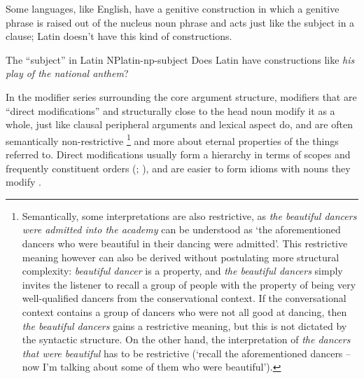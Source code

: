 \documentclass[a4paper, oneside, 12pt]{report}
\newcommand*{\citepage}[1]{p.~{#1}}
\newcommand*{\citepages}[1]{pp.~{#1}}
\newcommand{\form}[1]{\emph{#1}}
\newcommand{\translate}[1]{`#1'}
\begin{document}
Some languages, like English, have a genitive construction 
in which a genitive phrase is raised out of the nucleus noun phrase
and acts just like the subject in a clause;
Latin doesn't have this kind of constructions.

\begin{todobox}{The ``subject'' in Latin NP}{latin-np-subject}
    Does Latin have constructions like \form{his play of the national anthem}?
\end{todobox}

In the modifier series surrounding the core argument structure, 
modifiers that are ``direct modifications'' and structurally close to the head noun modify it as a whole,
just like clausal peripheral arguments and lexical aspect do,
and are often semantically non-restrictive%
\footnote{
    Semantically, some interpretations are also restrictive,
    as \form{the beautiful dancers were admitted into the academy}
    can be understood as \translate{the aforementioned dancers who were beautiful in their dancing were admitted}.
    This restrictive meaning however can also be derived without postulating more structural complexity:
    \form{beautiful dancer} is a property,
    and \form{the beautiful dancers} simply invites the listener to recall 
    a group of people with the property of being very well-qualified dancers from the conservational context.
    If the conversational context contains a group of dancers who were not all good at dancing,
    then \form{the beautiful dancers} gains a restrictive meaning,
    but this is not dictated by the syntactic structure. 
    On the other hand, the interpretation of \form{the dancers that were beautiful}
    has to be restrictive (\translate{recall the aforementioned dancers -- now I'm talking about some of them who were beautiful}).
}
and more about eternal properties of the things referred to.
Direct modifications usually form a hierarchy in terms of scopes and frequently constituent orders
(\citealt[\citepage{453}, {[10]}]{cgel}; \citealt[\citepages{25-34}]{cinque2010syntax}),
and are easier to form idioms with nouns they modify 
\citep[\citepage{108}]{cinque2010syntax}.
\end{document}
